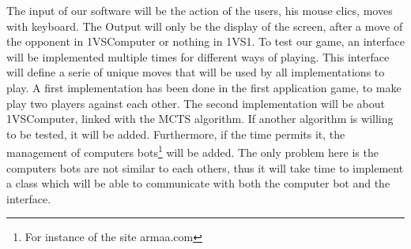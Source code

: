 The input of our software will be the action of the users, his mouse clics, moves with keyboard. The Output will only be the display of the screen, after a move of the opponent in 1VSComputer or nothing in 1VS1.
\smallbreak
To test our game, an interface will be implemented multiple times for different ways of playing. This interface will define a serie of unique moves that will be used by all implementations to play. A first implementation has been done in the first application game, to make play two players against each other. The second implementation will be about 1VSComputer, linked with the MCTS algorithm. If another algorithm is willing to be tested, it will be added.
\smallbreak
Furthermore, if the time permits it, the management of computers bots\footnote{For instance of the site armaa.com} will be added. The only problem here is the computers bots are not similar to each others, thus it will take time to implement a class which will be able to communicate with both the computer bot and the interface.